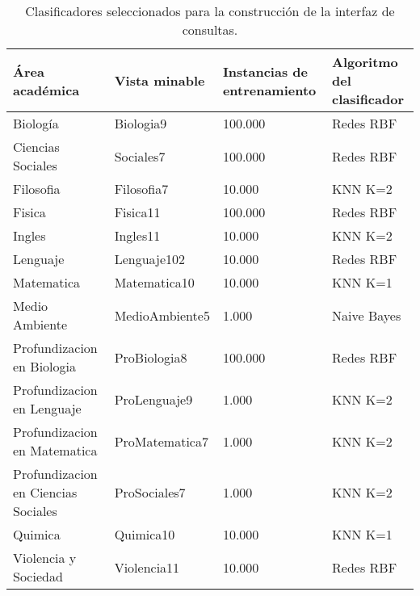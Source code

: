 \begin{table}[!Hhtb]
\centering
\begin{tabular}{|p{6.5cm}|p{3cm}|p{3cm}|p{3cm}|}
\hline
	\rowcolor[gray]{0.9} 
	\textbf{Área académica} &
	\textbf{Vista minable} &
	\textbf{Instancias de entrenamiento} &
	\textbf{Algoritmo del clasificador}
	\\
\hline
Biología & Biologia9 & 100.000 & Redes RBF \\
\hline
Ciencias Sociales & Sociales7 & 100.000 & Redes RBF \\
\hline
Filosofia & Filosofia7 & 10.000 & KNN K=2 \\
\hline
Fisica & Fisica11 & 100.000 & Redes RBF \\
\hline
Ingles & Ingles11 & 10.000 & KNN K=2 \\
\hline
Lenguaje & Lenguaje102 & 10.000 & Redes RBF \\
\hline
Matematica & Matematica10 & 10.000 & KNN K=1 \\
\hline
Medio Ambiente & MedioAmbiente5 & 1.000 & Naive Bayes \\
\hline
Profundizacion en Biologia & ProBiologia8 & 100.000 & Redes RBF \\
\hline
Profundizacion en Lenguaje & ProLenguaje9 & 1.000 & KNN K=2 \\
\hline
Profundizacion en Matematica & ProMatematica7 & 1.000 & KNN K=2 \\
\hline
Profundizacion en Ciencias Sociales & ProSociales7 & 1.000 & KNN K=2 \\
\hline
Quimica & Quimica10 & 10.000 & KNN K=1 \\
\hline
Violencia y Sociedad & Violencia11 & 10.000 & Redes RBF \\
\hline
\end{tabular}
\caption{Clasificadores seleccionados para la construcción de la interfaz de consultas.}
\label{tab:cuadro38}
\end{table}